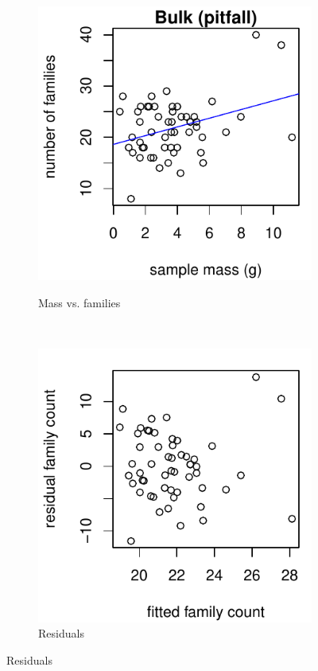 \documentclass[10pt,letterpaper,twocolumn]{article}
\begin{document}
\begin{figure}[h]
	\centering
	\begin{subfigure}[b]{0.15\textwidth}
		\caption{Mass vs. families}
		\includegraphics[width=\textwidth]{plots/bulk/2015_bulk_pitfall_scatter.pdf}
		\label{fig:bulk_pitfall_scatter}
	\end{subfigure}
	~
	\begin{subfigure}[b]{0.15\textwidth}
		\caption{Residuals}
		\includegraphics[width=\textwidth]{plots//bulk/2015_bulk_pitfall_residual.pdf}

\end{subfigure}
\end{figure}
\end{document}
